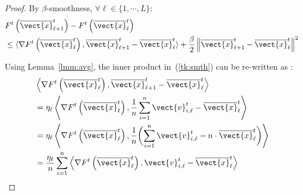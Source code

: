 \begin{proof}
By $\beta$-smoothness, $\forall \ell \in \{1, \cdots, L\}$: 
%
\begin{align}	\label{tk:smth}
    &F^{t}\left( \overline{\vect{x}}^{t}_{\ell+1} \right) - F^{t} \left( \overline{\vect{x}}^{t}_{\ell} \right)  \notag \\
    &\leq \langle \nabla F^{t} \left( \overline{\vect{x}}^t_{\ell} \right), \overline{\vect{x}}^t_{\ell+1} - \overline{\vect{x}}^t_{\ell} \rangle 
    	+ \frac{\beta}{2} \left \| \overline{\vect{x}}^t_{\ell+1} - \overline{\vect{x}}^t_{\ell} \right\|^{2}
\end{align} 

Using Lemma~\ref{lmm:avg}, the inner product in~(\ref{tk:smth}) can be re-written as : 
    \begin{align}	\label{tk:inner_beta}
        & \left \langle \nabla F^{t} \left( \overline{\vect{x}}^t_{\ell} \right), \overline{\vect{x}}^t_{\ell+1} - \overline{\vect{x}}^t_{\ell} \right \rangle 	\notag \\
        & = \eta_{\ell} \left \langle \nabla F^{t} \left( \overline{\vect{x}}^t_{\ell} \right), \frac{1}{n}\sum_{i=1}^{n} \vect{v}^t_{i,\ell} - \overline{\vect{x}}^t_{\ell} \right \rangle 	\notag \\
        &= \eta_{\ell} \left \langle \nabla F^{t} \left( \overline{\vect{x}}^t_{\ell} \right),  \frac{1}{n} \biggl(\sum_{i=1}^{n} \vect{v}^t_{i,\ell} - n \cdot \overline{\vect{x}}^t_{\ell} \biggr) \right \rangle 	\notag \\
        &=  \frac{\eta_{\ell}}{n}\sum_{i=1}^{n} \left \langle \nabla F^{t} \left( \overline{\vect{x}}^t_{\ell} \right), \vect{v}^t_{i,\ell} - \overline{\vect{x}}^t_{\ell} \right \rangle
    \end{align}


\end{proof}
